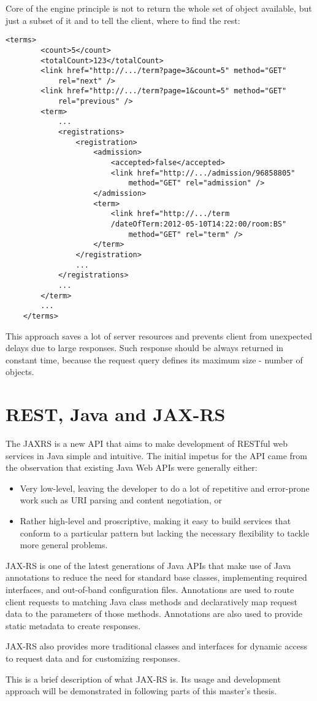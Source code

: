 	Core of the engine principle is not to return the whole set of object available, but just a subset of it and to
	tell the client, where to find the rest:
	
	\begin{lstlisting}[tabsize=2]
	<terms>
		<count>5</count>
		<totalCount>123</totalCount>
		<link href="http://.../term?page=3&count=5" method="GET" 
			rel="next" />
		<link href="http://.../term?page=1&count=5" method="GET" 
			rel="previous" />
		<term>
			...
			<registrations>
				<registration>
					<admission>
						<accepted>false</accepted>
						<link href="http://.../admission/96858805" 
							method="GET" rel="admission" />
					</admission>
					<term>
						<link href="http://.../term
						/dateOfTerm:2012-05-10T14:22:00/room:BS"
							method="GET" rel="term" />
					</term>
				</registration>
				...
			</registrations>
			...
		</term>
		...
	</terms>
	\end{lstlisting}
	
	This approach saves a lot of server resources and prevents client from unexpected delays due to large responses. Such
	response should be always returned in constant time, because the request query defines its maximum size - number of
	objects.
	
	\section{REST, Java and JAX-RS}
	
	\cite[p.~xiii]{restful} The \gls{JAXRS} is a new API that aims to make development of RESTful web services in Java
	simple and intuitive. The initial impetus for the API came from the observation that existing Java Web APIs were
	generally either:
	\begin{itemize}
	  \item Very low-level, leaving the developer to do a lot of repetitive and error-prone work such as URI parsing and
	  content negotiation, or
	  \item Rather high-level and proscriptive, making it easy to build services that conform to a particular pattern but
	  lacking the necessary flexibility to tackle more general problems. 
	\end{itemize}

	JAX-RS is one of the latest generations of Java APIs that make use of Java annotations to reduce the need for standard
	base classes, implementing required interfaces, and out-of-band configuration files. Annotations are used to route
	client requests to matching Java class methods and declaratively map request data to the parameters of those methods.
	Annotations are also used to provide static metadata to create responses.
	
	JAX-RS also provides more traditional classes and interfaces for dynamic access to request data and for customizing
	responses.
	
	This is a brief description of what JAX-RS is. Its usage and development approach will be demonstrated in following
	parts of this master's thesis.
